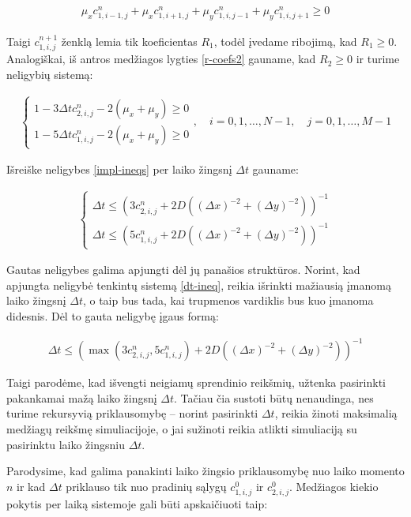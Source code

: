 \begin{align*}
    \mu_xc^n_{1,i-1,j}+\mu_xc^n_{1,i+1,j}+\mu_yc^n_{1,i,j-1}+\mu_yc^n_{1,i,j+1}\geqslant 0
\end{align*}

Taigi $c^{n+1}_{1,i,j}$ ženklą lemia tik koeficientas $R_1$, todėl įvedame ribojimą, kad $R_1\geqslant 0$. Analogiškai, iš antros medžiagos lygties \eqref{r-coefs2} gauname, kad $R_2\geqslant 0$ ir turime neligybių sistemą:

\begin{align} \label{impl-ineqs}
  \begin{cases}
    1-3\Delta tc^{n}_{2,i,j}-2(\mu_x+\mu_y)\geqslant 0\\
    1-5\Delta tc^{n}_{1,i,j}-2(\mu_x+\mu_y)\geqslant 0
  \end{cases}, \quad i=0,1,\dots,N-1, \quad j=0,1,\dots,M-1
\end{align}

Išreiške neligybes \eqref{impl-ineqs} per laiko žingsnį $\Delta t$ gauname:

\begin{align} \label{dt-ineq}
  \begin{cases}
    \Delta t \leqslant (3c^{n}_{2,i,j}+2D((\Delta x)^{-2}+(\Delta y)^{-2}))^{-1}\\
    \Delta t \leqslant (5c^{n}_{1,i,j}+2D((\Delta x)^{-2}+(\Delta y)^{-2}))^{-1}
  \end{cases}
\end{align}

Gautas neligybes galima apjungti dėl jų panašios struktūros. Norint, kad apjungta neligybė tenkintų sistemą \eqref{dt-ineq}, reikia išrinkti mažiausią įmanomą laiko žingsnį $\Delta t$, o taip bus tada, kai trupmenos vardiklis bus kuo įmanoma didesnis. Dėl to gauta neligybę įgaus formą:

\begin{align}
  \Delta t \leqslant \left(\max(3c^{n}_{2,i,j}, 5c^{n}_{1,i,j})+2D\left((\Delta x)^{-2}+(\Delta y)^{-2}\right)\right)^{-1}
\end{align}

Taigi parodėme, kad išvengti neigiamų sprendinio reikšmių, užtenka pasirinkti pakankamai mažą laiko žingsnį $\Delta t$. Tačiau čia sustoti būtų nenaudinga, nes turime rekursyvią priklausomybę -- norint pasirinkti $\Delta t$, reikia žinoti maksimalią medžiagų reikšmę simuliacijoje, o jai sužinoti reikia atlikti simuliaciją su pasirinktu laiko žingsniu $\Delta t$.

Parodysime, kad galima panakinti laiko žingsio priklausomybę nuo laiko momento $n$ ir kad $\Delta t$ priklauso tik nuo pradinių sąlygų $c^0_{1,i,j}$ ir $c^0_{2,i,j}$. Medžiagos kiekio pokytis per laiką sistemoje gali būti apskaičiuoti taip:

